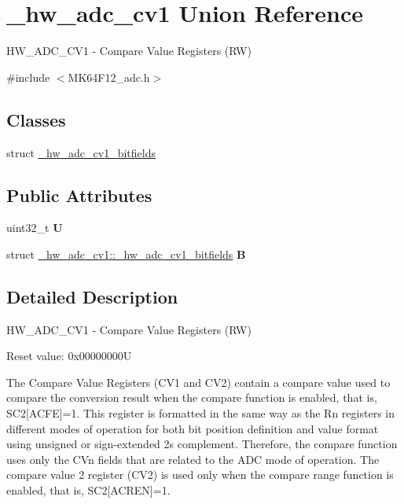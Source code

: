 \hypertarget{union__hw__adc__cv1}{}\section{\+\_\+hw\+\_\+adc\+\_\+cv1 Union Reference}
\label{union__hw__adc__cv1}


H\+W\+\_\+\+A\+D\+C\+\_\+\+C\+V1 -\/ Compare Value Registers (RW)  




{\ttfamily \#include $<$M\+K64\+F12\+\_\+adc.\+h$>$}

\subsection*{Classes}
\begin{DoxyCompactItemize}
\item 
struct \hyperlink{struct__hw__adc__cv1_1_1__hw__adc__cv1__bitfields}{\+\_\+hw\+\_\+adc\+\_\+cv1\+\_\+bitfields}
\end{DoxyCompactItemize}
\subsection*{Public Attributes}
\begin{DoxyCompactItemize}
\item 
uint32\+\_\+t {\bfseries U}\hypertarget{union__hw__adc__cv1_a4e7adb8376796e625109ebecf80681fd}{}\label{union__hw__adc__cv1_a4e7adb8376796e625109ebecf80681fd}

\item 
struct \hyperlink{struct__hw__adc__cv1_1_1__hw__adc__cv1__bitfields}{\+\_\+hw\+\_\+adc\+\_\+cv1\+::\+\_\+hw\+\_\+adc\+\_\+cv1\+\_\+bitfields} {\bfseries B}\hypertarget{union__hw__adc__cv1_abf5a9d68929c4c0b9c25790cd6697d9f}{}\label{union__hw__adc__cv1_abf5a9d68929c4c0b9c25790cd6697d9f}

\end{DoxyCompactItemize}


\subsection{Detailed Description}
H\+W\+\_\+\+A\+D\+C\+\_\+\+C\+V1 -\/ Compare Value Registers (RW) 

Reset value\+: 0x00000000U

The Compare Value Registers (C\+V1 and C\+V2) contain a compare value used to compare the conversion result when the compare function is enabled, that is, S\+C2\mbox{[}A\+C\+FE\mbox{]}=1. This register is formatted in the same way as the Rn registers in different modes of operation for both bit position definition and value format using unsigned or sign-\/extended 2\textquotesingle{}s complement. Therefore, the compare function uses only the C\+Vn fields that are related to the A\+DC mode of operation. The compare value 2 register (C\+V2) is used only when the compare range function is enabled, that is, S\+C2\mbox{[}A\+C\+R\+EN\mbox{]}=1. 

